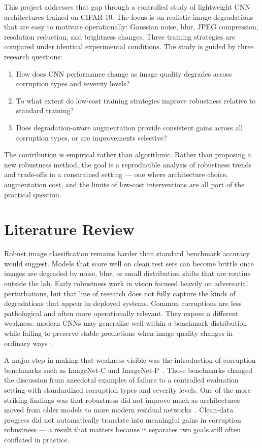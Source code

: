 \documentclass[conference]{IEEEtran}
\begin{document}
This project addresses that gap through a controlled study of lightweight CNN architectures trained on CIFAR-10. The focus is on realistic image degradations that are easy to motivate operationally: Gaussian noise, blur, JPEG compression, resolution reduction, and brightness changes. Three training strategies are compared under identical experimental conditions. The study is guided by three research questions:
\begin{enumerate}
    \item How does CNN performance change as image quality degrades across corruption types and severity levels?
    \item To what extent do low-cost training strategies improve robustness relative to standard training?
    \item Does degradation-aware augmentation provide consistent gains across all corruption types, or are improvements selective?
\end{enumerate}

The contribution is empirical rather than algorithmic. Rather than proposing a new robustness method, the goal is a reproducible analysis of robustness trends and trade-offs in a constrained setting --- one where architecture choice, augmentation cost, and the limits of low-cost interventions are all part of the practical question.

\section{Literature Review}

Robust image classification remains harder than standard benchmark accuracy would suggest. Models that score well on clean test sets can become brittle once images are degraded by noise, blur, or small distribution shifts that are routine outside the lab. Early robustness work in vision focused heavily on adversarial perturbations, but that line of research does not fully capture the kinds of degradations that appear in deployed systems. Common corruptions are less pathological and often more operationally relevant. They expose a different weakness: modern CNNs may generalize well within a benchmark distribution while failing to preserve stable predictions when image quality changes in ordinary ways~\cite{hendrycks2019}.

A major step in making that weakness visible was the introduction of corruption benchmarks such as ImageNet-C and ImageNet-P~\cite{hendrycks2019}. Those benchmarks changed the discussion from anecdotal examples of failure to a controlled evaluation setting with standardized corruption types and severity levels. One of the more striking findings was that robustness did not improve much as architectures moved from older models to more modern residual networks~\cite{hendrycks2019}. Clean-data progress did not automatically translate into meaningful gains in corruption robustness --- a result that matters because it separates two goals still often conflated in practice.
\end{document}
